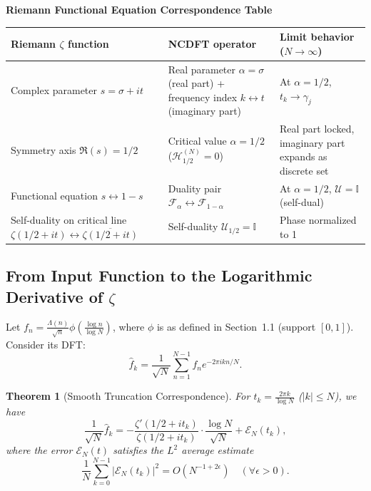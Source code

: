 \documentclass[12pt,a4paper]{amsart}
\theoremstyle{plain}
\newtheorem{theorem}{Theorem}[section]
\theoremstyle{definition}
\theoremstyle{remark}
\begin{document}
\begin{center}
\textbf{Riemann Functional Equation Correspondence Table}
\medskip
\begin{tabular}{|l|l|l|}
\hline
Riemann $\zeta$ function & NCDFT operator & Limit behavior ($N\to\infty$) \\
\hline
Complex parameter $s = \sigma + it$ & Real parameter $\alpha = \sigma$ (real part) + frequency index $k\leftrightarrow t$ (imaginary part) & At $\alpha=1/2$, $t_k \to \gamma_j$ \\
Symmetry axis $\Re(s) = 1/2$ & Critical value $\alpha = 1/2$ ($\mathcal{H}_{1/2}^{(N)}=0$) & Real part locked, imaginary part expands as discrete set \\
Functional equation $s \leftrightarrow 1-s$ & Duality pair $\mathcal{F}_\alpha \leftrightarrow \mathcal{F}_{1-\alpha}$ & At $\alpha=1/2$, $\mathcal{U}=\mathbb{I}$ (self-dual) \\
Self-duality on critical line $\zeta(1/2+it) \leftrightarrow \overline{\zeta(1/2+it)}$ & Self-duality $\mathcal{U}_{1/2} = \mathbb{I}$ & Phase normalized to 1 \\
\hline
\end{tabular}
\end{center}

\subsection{From Input Function to the Logarithmic Derivative of $\zeta$}

Let $f_n = \frac{\Lambda(n)}{\sqrt{n}} \phi\left(\frac{\log n}{\log N}\right)$, where $\phi$ is as defined in Section~1.1 (support $[0,1]$). Consider its DFT:
\[
\hat{f}_k = \frac{1}{\sqrt{N}}\sum_{n=1}^{N-1} f_n e^{-2\pi i k n/N}.
\]

\begin{theorem}[Smooth Truncation Correspondence]\label{thm:smoothtrunc}
For $t_k = \frac{2\pi k}{\log N}$ ($|k|\le N$), we have
\[
\frac{1}{\sqrt{N}}\hat{f}_k = -\frac{\zeta'(1/2+it_k)}{\zeta(1/2+it_k)}\cdot\frac{\log N}{\sqrt{N}} + \mathcal{E}_N(t_k),
\]
where the error $\mathcal{E}_N(t)$ satisfies the $L^2$ average estimate
\[
\frac{1}{N}\sum_{k=0}^{N-1} |\mathcal{E}_N(t_k)|^2 = O(N^{-1+2\epsilon}) \quad (\forall \epsilon>0).
\]
\end{theorem}
\end{document}
